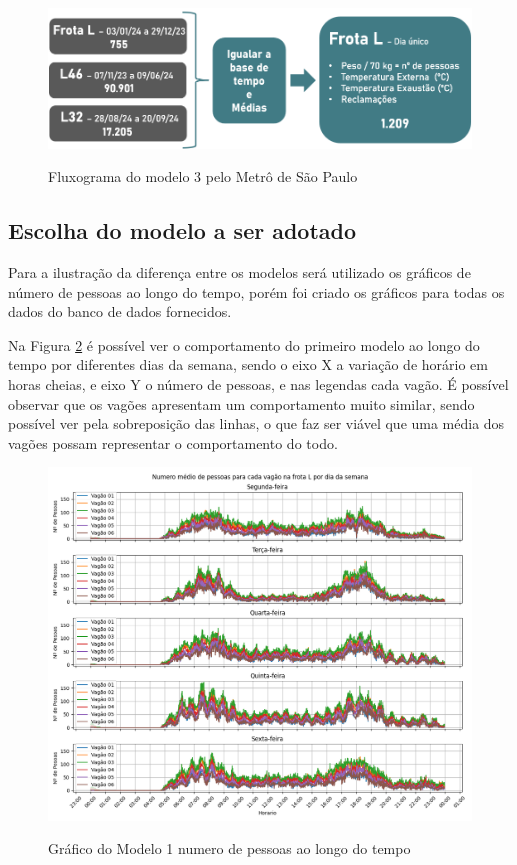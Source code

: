 \documentclass[acronym,symbols,table]{fei}
\begin{document}
\begin{figure}[!htb]
    \centering
    \caption{Fluxograma do modelo 3 pelo Metrô de São Paulo}
    \includegraphics[width=0.8\linewidth]{Imagens/Fluxograma_dos_dados_modelo_3.png}
    \label{fig:Fluxograma_tratamento_dados_m3}
\end{figure}

\newpage 

\subsection{Escolha do modelo a ser adotado}

Para a ilustração da diferença entre os modelos será utilizado os gráficos de número de pessoas ao longo do tempo, porém foi criado os gráficos para todas os dados do banco de dados fornecidos. 

Na Figura \ref{fig:modelo1} é possível ver o comportamento do primeiro modelo ao longo do tempo por diferentes dias da semana, sendo o eixo X a variação de horário em horas cheias, e eixo Y o número de pessoas, e nas legendas cada vagão. É possível observar que os vagões apresentam um comportamento muito similar, sendo possível ver pela sobreposição das linhas, o que faz ser viável que uma média dos vagões possam representar o comportamento do todo.

\begin{figure}[!htb]
    \centering
	\caption{Gráfico do Modelo 1 numero de pessoas ao longo do tempo}
    \includegraphics[width=0.8\linewidth]{Imagens/Modelo_1-Numero_medio_de_pessoas_para_cada_vagao_na_frota_L_por_dia_da_semana.png}
    \label{fig:modelo1}
\end{figure}
\end{document}
